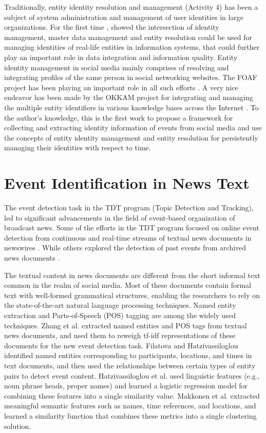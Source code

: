 Traditionally, entity identity resolution and management (Activity 4) has been a subject of system administration and management of user identities in large organizations. For the first time \cite{zhou2011entity}, showed the intersection of identity management, master data management and entity resolution could be used for managing identities of real-life entities in information systems, that could further play an important role in data integration and information quality. Entity identity management in social media mainly comprises of resolving and integrating profiles of the same person in social networking websites. The FOAF project has been playing an important role in all such efforts \cite{bouquet2010entity,bortoli2007foaf,raad2010user}. A very nice endeavor has been made by the OKKAM project for integrating and managing the multiple entity identifiers in various knowledge bases across the Internet \cite{bouquet2006okkam}. To the author's knowledge, this is the first work to propose a framework for collecting and extracting identity information of events from social media and use the concepts of entity identity management and entity resolution for persistently managing their identities with respect to time.


\section{Event Identification in News Text}
The event detection task \cite{allan2002topic} in the TDT program (Topic Detection and Tracking), led to significant advancements in the field of event-based organization of broadcast news. Some of the efforts in the TDT program focused on online event detection from continuous and real-time streams of textual news documents in newswires \cite{allan1998line,kumaran2004text}. While others explored the detection of past events from archived news documents \cite{yang1998study}. 

The textual content in news documents are different from the short informal text common in the realm of social media.  Most of these documents contain formal text with well-formed grammatical structures, enabling the researchers to rely on the state-of-the-art natural language processing techniques. Named entity extraction and Parts-of-Speech (POS) tagging are among the widely used techniques. Zhang et al. \cite{zhang2007new} extracted named entities and POS tags from textual news documents, and used them to reweigh tf-idf representations of these documents for the new event detection task. Filatova and Hatzivassiloglou \cite{hatzivassiloglou2003domain} identified named entities corresponding to participants, locations, and times in text documents, and then used the relationships between certain types of entity pairs to detect event content. Hatzivassiloglou et al. \cite{hatzivassiloglou2000investigation} used linguistic features (e.g., noun phrase heads, proper names) and learned a logistic regression model for combining these features into a single similarity value. Makkonen et al. \cite{makkonen2004simple} extracted meaningful semantic features such as names, time references, and locations, and learned a similarity function that combines these metrics into a single clustering solution. 

